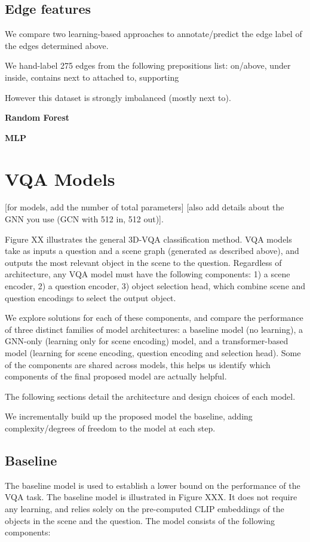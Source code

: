 \subsection{Edge features}
We compare two learning-based approaches to annotate/predict the edge label of the edges determined above.

We hand-label 275 edges from the following prepositions list:
on/above, under
inside, contains
next to
attached to, supporting

However this dataset is strongly imbalanced (mostly next to). 

\bigskip
\noindent
\textbf{Random Forest}

\bigskip
\noindent
\textbf{MLP}






\section{VQA Models}

[for models, add the number of total parameters]
[also add details about the GNN you use (GCN with 512 in, 512 out)].


Figure XX illustrates the general 3D-VQA classification method. VQA models take as inputs a question and a scene graph (generated as described above), and outputs the most relevant object in the scene to the question. Regardless of architecture, any VQA model must have the following components: 1) a scene encoder, 2) a question encoder, 3) object selection head, which combine scene and question encodings to select the output object.

We explore solutions for each of these components, and compare the performance of three distinct families of model architectures: a baseline model (no learning), a GNN-only (learning only for scene encoding) model, and a transformer-based model (learning for scene encoding, question encoding and selection head). Some of the components are shared across models, this helps us identify which components of the final proposed model are actually helpful.

The following sections detail the architecture and design choices of each model.

We incrementally build up the proposed model the baseline, adding complexity/degrees of freedom to the model at each step.


\subsection{Baseline}
The baseline model is used to establish a lower bound on the performance of the VQA task. The baseline model is illustrated in Figure XXX. It does not require any learning, and relies solely on the pre-computed CLIP embeddings of the objects in the scene and the question. The model consists of the following components:

